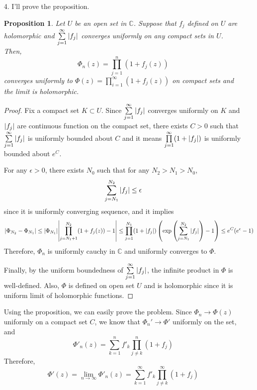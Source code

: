 \documentclass{article}
\newtheorem{proposition}{Proposition}
\begin{document}
\begin{enumerate}
\item[4.] I'll prove the proposition.
\begin{proposition}
Let $U$ be an open set in $\mathbb{C}$. Suppose that $f_j$ defined on $U$ are holomorphic and $\sum\limits_{j=1}^\infty \abs{f_j}$ converges uniformly on any compact sets in $U$. Then,
\begin{equation*}
\Phi_n(z)=\prod_{j=1}^n (1+f_j(z))
\end{equation*}
converges uniformly to $\Phi(z)=\prod_{i=1}^\infty (1+f_j(z))$ on compact sets and the limit is holomorphic.
\end{proposition}
\begin{proof}
Fix a compact set $K\subset U$. Since $\sum\limits_{j=1}^\infty \abs{f_j}$ converges uniformly on $K$ and $\abs{f_j}$ are continuous function on the compact set, there exists $C>0$ such that $\sum\limits_{j=1}^\infty \abs{f_j}$ is uniformly bounded about $C$ and it means $\prod\limits_{j=1}^\infty (1+\abs{f_j})$ is uniformly bounded about $e^C$.

For any $\epsilon>0$, there exists $N_0$ such that for any $N_2>N_1>N_0$, 
\begin{equation*}
\sum\limits_{j=N_1}^{N_2} \abs{f_j}\leq \epsilon
\end{equation*}
since it is uniformly converging sequence, and it implies
\begin{equation*}
\abs{\Phi_{N_2}-\Phi_{N_1}}\leq \abs{\Phi_{N_1}}\abs{\prod_{j=N_1+1}^{N_2}(1+f_j(z))-1}\leq \prod_{j=1}^{N_1} (1+\abs{f_j})\left(\exp\left(\sum\limits_{j=N_1}^{N_2} \abs{f_j}\right)-1\right)\leq e^C(e^\epsilon-1)
\end{equation*}
Therefore, $\Phi_n$ is uniformly cauchy in $\mathbb{C}$ and uniformly converges to $\Phi$.

Finally, by the uniform boundedness of $\sum\limits_{j=1}^\infty \abs{f_j}$, the infinite product in $\Phi$ is well-defined. Also, $\Phi$ is defined on open set $U$ and is holomorphic since it is uniform limit of holomorphic functions.
\end{proof}

Using the proposition, we can easily prove the problem. Since $\Phi_n\rightarrow \Phi(z)$ uniformly on a compact set $C$, we know that $\Phi_n'\rightarrow \Phi'$ uniformly on the set, and 
\begin{equation*}
\Phi'_n(z)=\sum\limits_{k=1}^n f'_k\prod\limits_{j\neq k}^n (1+f_j)
\end{equation*}
Therefore,
\begin{equation*}
\Phi'(z)=\lim\limits_{n\rightarrow \infty}\Phi'_n(z)=\sum\limits_{k=1}^\infty f'_k\prod\limits_{j\neq k}^\infty (1+f_j)
\end{equation*}
\end{enumerate}
\end{document}
